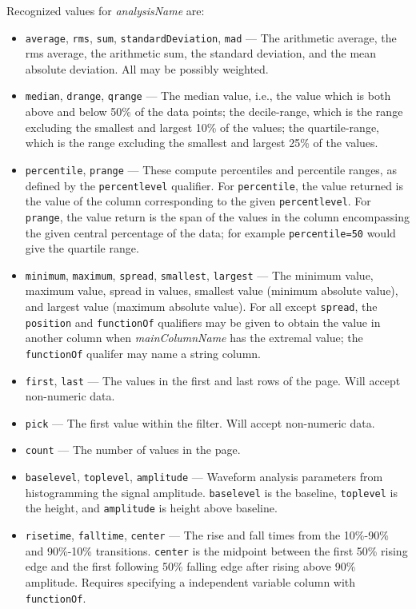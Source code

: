 \begin{itemize}
\begin{itemize}
\begin{itemize}
Recognized values for {\em analysisName} are:
\begin{itemize}
\item {\tt average}, {\tt rms}, {\tt sum}, {\tt standardDeviation}, {\tt mad} --- The arithmetic average, 
the rms average, the arithmetic sum, the standard deviation, and the mean absolute deviation.  All may be possibly
weighted.
\item {\tt median}, {\tt drange}, {\tt qrange} --- The median value, i.e., the value which is both above and below
50\% of the data points; the decile-range, which is the range excluding the smallest and largest 10\% of the values;
the quartile-range, which is the range excluding the smallest and largest 25\% of the values.
\item {\tt percentile}, {\tt prange} --- These compute percentiles and percentile ranges, as defined by the 
  {\tt percentlevel} qualifier.  For {\tt percentile}, the value returned is the value of the column corresponding
  to the given {\tt percentlevel}.  For {\tt prange}, the value return is the span of the values in the column
  encompassing the given central percentage of the data; for example {\tt percentile=50} would give the quartile range.

\item {\tt minimum}, {\tt maximum}, {\tt spread}, {\tt smallest}, {\tt largest} --- 
The minimum value, maximum value, spread in values, smallest value (minimum absolute value), and largest value
(maximum absolute value).  For all except {\tt spread}, the {\tt position} and {\tt functionOf} qualifiers may be
given to obtain the value in another column when {\em mainColumnName} has the extremal value; the {\tt functionOf} qualifer may name a string column.

\item {\tt first}, {\tt last} --- The values in the first and last rows of the page.  Will accept non-numeric
data.
\item {\tt pick} --- The first value within the filter.  Will accept non-numeric data.
\item {\tt count} ---  The number of values in the page.
\item {\tt baselevel}, {\tt toplevel}, {\tt amplitude} --- Waveform analysis parameters from histogramming
the signal amplitude.  {\tt baselevel} is the baseline, {\tt toplevel} is the height, and {\tt amplitude}
is height above baseline.

\item {\tt risetime}, {\tt falltime}, {\tt center} --- The rise and fall times from the 10\%-90\% and
90\%-10\% transitions.  {\tt center} is the midpoint between the first 50\% rising edge and the first following 50\%
falling edge after rising above 90\% amplitude.  Requires specifying a independent variable column with {\tt
functionOf}.


\end{itemize}
\end{itemize}
\end{itemize}
\end{itemize}
